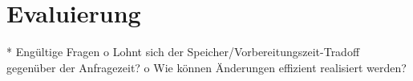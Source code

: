 \chapter{Evaluierung}
    * Engültige Fragen
          o Lohnt sich der Speicher/Vorbereitungszeit-Tradoff gegenüber der Anfragezeit?
          o Wie können Änderungen effizient realisiert werden? 